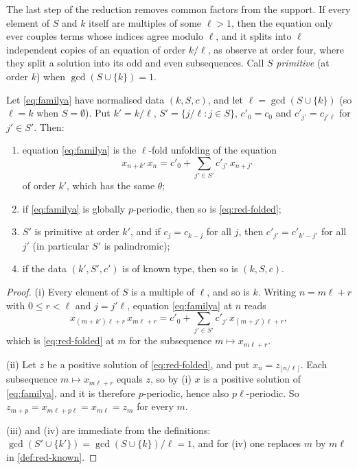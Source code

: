 The last step of the reduction removes common factors from the support. If
every element of $S$ and $k$ itself are multiples of some $\ell>1$, then the
equation only ever couples terms whose indices agree modulo $\ell$, and it splits
into $\ell$ independent copies of an equation of order $k/\ell$, as
\citet{CimaGasullManosas2004} observe at order four, where they split a
solution into its odd and even subsequences. Call $S$
\textit{primitive} (at order $k$) when $\gcd(S\cup\{k\})=1$.

\begin{lemma}[folding]
\label{lem:unfold}
Let \eqref{eq:familya} have normalised data $(k,S,c)$, and let
$\ell=\gcd(S\cup\{k\})$ (so $\ell=k$ when $S=\emptyset$). Put $k'=k/\ell$,
$S'=\{j/\ell:j\in S\}$, $c'_0=c_0$ and $c'_{j'}=c_{j'\ell}$ for $j'\in S'$. Then:
\begin{enumerate}
\item[(i)] equation \eqref{eq:familya} is the $\ell$-fold unfolding of the
equation
\begin{equation}
x_{n+k'}\,x_n=c'_0+\sum_{j'\in S'}c'_{j'}\,x_{n+j'}
\label{eq:red-folded}
\end{equation}
of order $k'$, which has the same $\theta$;
\item[(ii)] if \eqref{eq:familya} is globally $p$-periodic, then so is
\eqref{eq:red-folded};
\item[(iii)] $S'$ is primitive at order $k'$, and if $c_j=c_{k-j}$ for all $j$,
then $c'_{j'}=c'_{k'-j'}$ for all $j'$ (in particular $S'$ is palindromic);
\item[(iv)] if the data $(k',S',c')$ is of known type, then so is $(k,S,c)$.
\end{enumerate}
\end{lemma}

\begin{proof}
(i) Every element of $S$ is a multiple of $\ell$, and so is $k$. Writing
$n=m\ell+r$ with $0\le r<\ell$ and $j=j'\ell$, equation \eqref{eq:familya} at $n$ reads
\begin{equation*}
x_{(m+k')\ell+r}\,x_{m\ell+r}=c'_0+\sum_{j'\in S'}c'_{j'}\,x_{(m+j')\ell+r},
\end{equation*}
which is \eqref{eq:red-folded} at $m$ for the subsequence $m\mapsto x_{m\ell+r}$.

(ii) Let $z$ be a positive solution of \eqref{eq:red-folded}, and put
$x_n=z_{\lfloor n/\ell\rfloor}$. Each subsequence $m\mapsto x_{m\ell+r}$ equals $z$,
so by (i) $x$ is a positive solution of \eqref{eq:familya}, and it is therefore
$p$-periodic, hence also $p\ell$-periodic. So
$z_{m+p}=x_{m\ell+p\ell}=x_{m\ell}=z_m$ for every $m$.

(iii) and (iv) are immediate from the definitions:
$\gcd(S'\cup\{k'\})=\gcd(S\cup\{k\})/\ell=1$, and for (iv) one replaces $m$
by $m\ell$ in \autoref{def:red-known}.
\end{proof}

